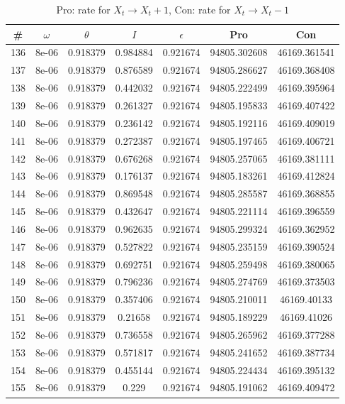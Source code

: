 \newpage
\begin{table}
\caption{Pro: rate for $X_t \rightarrow X_t + 1$, Con: rate for $X_t \rightarrow X_t - 1$}
\begin{tabular*}{\linewidth}{c|c|c|c|c|c|c}
\# & $\omega$ & $\theta$ & $I$ & $\epsilon$ & Pro & Con \\
\hline
136 & 8e-06 & 0.918379 & 0.984884 & 0.921674 & 94805.302608 & 46169.361541\\
137 & 8e-06 & 0.918379 & 0.876589 & 0.921674 & 94805.286627 & 46169.368408\\
138 & 8e-06 & 0.918379 & 0.442032 & 0.921674 & 94805.222499 & 46169.395964\\
139 & 8e-06 & 0.918379 & 0.261327 & 0.921674 & 94805.195833 & 46169.407422\\
140 & 8e-06 & 0.918379 & 0.236142 & 0.921674 & 94805.192116 & 46169.409019\\
141 & 8e-06 & 0.918379 & 0.272387 & 0.921674 & 94805.197465 & 46169.406721\\
142 & 8e-06 & 0.918379 & 0.676268 & 0.921674 & 94805.257065 & 46169.381111\\
143 & 8e-06 & 0.918379 & 0.176137 & 0.921674 & 94805.183261 & 46169.412824\\
144 & 8e-06 & 0.918379 & 0.869548 & 0.921674 & 94805.285587 & 46169.368855\\
145 & 8e-06 & 0.918379 & 0.432647 & 0.921674 & 94805.221114 & 46169.396559\\
146 & 8e-06 & 0.918379 & 0.962635 & 0.921674 & 94805.299324 & 46169.362952\\
147 & 8e-06 & 0.918379 & 0.527822 & 0.921674 & 94805.235159 & 46169.390524\\
148 & 8e-06 & 0.918379 & 0.692751 & 0.921674 & 94805.259498 & 46169.380065\\
149 & 8e-06 & 0.918379 & 0.796236 & 0.921674 & 94805.274769 & 46169.373503\\
150 & 8e-06 & 0.918379 & 0.357406 & 0.921674 & 94805.210011 & 46169.40133\\
151 & 8e-06 & 0.918379 & 0.21658 & 0.921674 & 94805.189229 & 46169.41026\\
152 & 8e-06 & 0.918379 & 0.736558 & 0.921674 & 94805.265962 & 46169.377288\\
153 & 8e-06 & 0.918379 & 0.571817 & 0.921674 & 94805.241652 & 46169.387734\\
154 & 8e-06 & 0.918379 & 0.455144 & 0.921674 & 94805.224434 & 46169.395132\\
155 & 8e-06 & 0.918379 & 0.229 & 0.921674 & 94805.191062 & 46169.409472\\

\end{tabular*}
\end{table}
